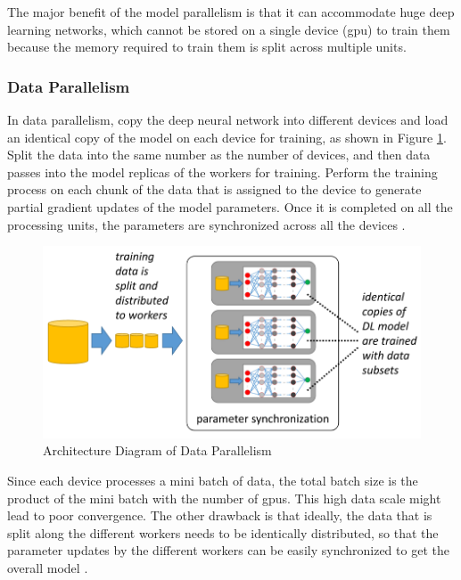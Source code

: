 The major benefit of the model parallelism is that it can accommodate huge deep learning networks, which cannot be stored on a single device (\acrshort{gpu}) to train them because the memory required to train them is split across multiple units. 

\subsubsection{Data Parallelism}
In data parallelism, copy the deep neural network into different devices and load an identical copy of the model on each device for training, as shown in Figure \ref{fig:dataparallel}. Split the data into the same number as the number of devices, and then data passes into the model replicas of the workers for training. Perform the training process on each chunk of the data that is assigned to the device to generate partial gradient updates of the model parameters. Once it is completed on all the processing units, the parameters are synchronized across all the devices \cite{Koliousis2019CROSSBOW:Servers}. 

\begin{figure}[ht]
  \begin{center}
    \includegraphics[width=\textwidth]{images/data parallelism.png} 
    \caption{Architecture Diagram of Data Parallelism  \cite{Mayer2020ScalableInfrastructures}}
    \label{fig:dataparallel}
  \end{center}
\end{figure}

Since each device processes a mini batch of data, the total batch size is the product of the mini batch with the number of \acrshort{gpu}s. This high data scale might lead to poor convergence. The other drawback is that ideally, the data that is split along the different workers needs to be identically distributed, so that the parameter updates by the different workers can be easily synchronized to get the overall model \cite{Jia2018BeyondNetworks}.

